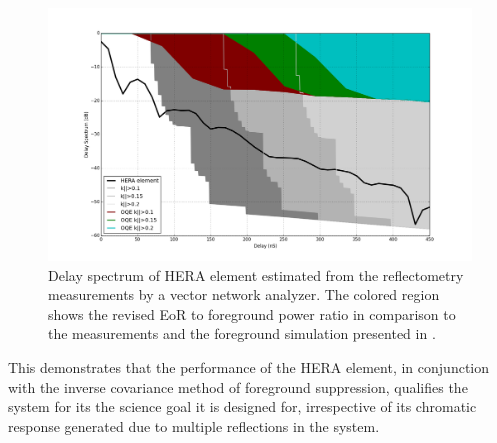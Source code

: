 \documentclass[twocolumn]{emulateapj}
\begin{document}
    \begin{figure}
    \centering
    \includegraphics[width=\linewidth]{GB_reflectometry_part3/plot/HERA_ds_fg_sim_rev.png}
    \caption{Delay spectrum of HERA element estimated from the reflectometry measurements by a vector network analyzer. The colored region shows the revised EoR to foreground power ratio in comparison to the measurements and the foreground simulation presented in \cite{Thyagarajan_et_al2016}.}
    \label{fig:sim_fg_revised}
    \end{figure}
    This demonstrates that the performance of the HERA element, in conjunction with the inverse covariance method of foreground suppression, qualifies the system for its the science goal it is designed for, irrespective of its chromatic response generated due to multiple reflections in the system.
    
\end{document}
